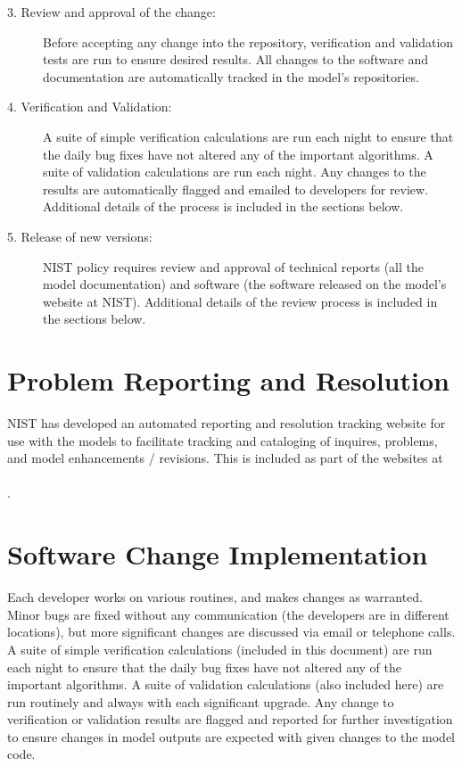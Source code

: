 \documentclass[11pt]{book}
\begin{document}
\begin{description}
\item [3. Review and approval of the change:] Before accepting any change into the repository, verification and validation tests are run to ensure desired results. All changes to the software and documentation are automatically tracked in the model's repositories.
\item [4. Verification and Validation:] A suite of simple verification calculations are run each night to ensure that the daily bug fixes have not altered any of the important algorithms. A suite of validation calculations are run each night. Any changes to the results are automatically flagged and emailed to developers for review. Additional details of the process is included in the sections below.
\item [5. Release of new versions:] NIST policy requires review and approval of technical reports (all the model documentation) and software (the software released on the model's website at NIST). Additional details of the review process is included in the sections below.
\end{description}

\section{Problem Reporting and Resolution}

NIST has developed an automated reporting and resolution tracking website for use with the models to facilitate tracking and cataloging of inquires, problems, and model enhancements / revisions. This is included as part of the websites at \newline
\href{https://github.com/firemodels/fds/issues}{} \\
\href{https://github.com/firemodels/smv/issues}{} \\
\href{https://github.com/firemodels/cfast/issues}{}.

\section{Software Change Implementation}

Each developer works on various routines, and makes changes as warranted. Minor bugs are fixed without any communication (the developers are in different locations), but more significant changes are discussed via email or telephone calls. A suite of simple verification calculations (included in this document) are run each night to ensure that the daily bug fixes have not altered any of the important algorithms. A suite of validation calculations (also included here) are run routinely and always with each significant upgrade. Any change to verification or validation results are flagged and reported for further investigation to ensure changes in model outputs are expected with given changes to the model code.
\end{document}
